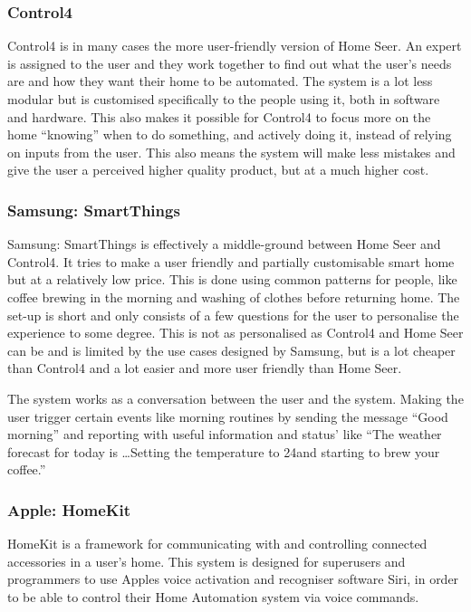 \subsubsection{Control4}
Control4 is in many cases the more user-friendly version of Home Seer. An expert is assigned to the user and they work together to find out what the user's needs are and how they want their home to be automated. The system is a lot less modular but is customised specifically to the people using it, both in software and hardware. This also makes it possible for Control4 to focus more on the home \enquote{knowing} when to do something, and actively doing it, instead of relying on inputs from the user. This also means the system will make less mistakes and give the user a perceived higher quality product, but at a much higher cost.%

\subsubsection{Samsung: SmartThings}
Samsung: SmartThings is effectively a middle-ground between Home Seer and Control4. It tries to make a user friendly and partially customisable smart home but at a relatively low price. This is done using common patterns for people, like coffee brewing in the morning and washing of clothes before returning home. The set-up is short and only consists of a few questions for the user to personalise the experience to some degree. This is not as personalised as Control4 and Home Seer can be and is limited by the use cases designed by Samsung, but is a lot cheaper than Control4 and a lot easier and more user friendly than Home Seer.

The system works as a conversation between the user and the system. Making the user trigger certain events like morning routines by sending the message \enquote{Good morning} and reporting with useful information and status' like \enquote{The weather forecast for today is \dots Setting the temperature to 24\degree and starting to brew your coffee.}

\subsubsection{Apple: HomeKit}
HomeKit is a framework for communicating with and controlling connected accessories in a user's home. %
This system is designed for superusers and programmers to use Apples voice activation and recogniser software Siri, in order to be able to control their Home Automation system via voice commands.

